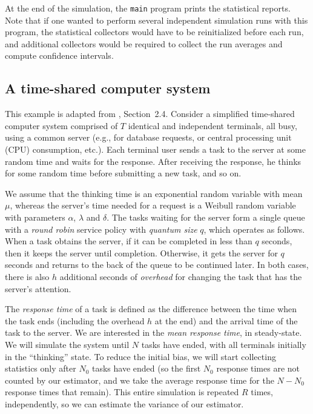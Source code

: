 At the end of the simulation, the \texttt{main} program prints the
statistical reports.  Note that if one wanted to perform several independent
simulation runs with this program, the statistical collectors would
have to be reinitialized before each run, and additional collectors
would be required to collect the run averages and compute confidence
intervals.





\subsection {A time-shared computer system}
\label {sec:timeshared}

This example is adapted from \cite{sLAW00a}, Section~2.4.
Consider a simplified time-shared computer system comprised of $T$
identical and independent terminals, all busy, using a common server
(e.g., for database requests, or central processing unit (CPU)
consumption, etc.).
Each terminal user sends a task to the server at some random time and
waits for the response.  After receiving the response, he thinks
for some random time before submitting a new task, and so on.

We assume that the thinking time is an exponential  random variable
with mean $\mu$, whereas the server's time needed for a request is a
Weibull random variable with parameters $\alpha$, $\lambda$ and $\delta$.
The tasks waiting for the server form a single queue with a
{\em round robin\/} service policy with {\em quantum size\/} $q$,
which operates as follows.
When a task obtains the server, if it can be completed in less than $q$
seconds, then it keeps the server until completion.
Otherwise, it gets the server for $q$ seconds and returns to the back
of the queue to be continued later.
In both cases, there is also $h$ additional seconds of {\em overhead\/}
for changing the task that has the server's attention.


The {\em response time\/} of a task is defined as the difference
between the time when the task ends (including the overhead $h$ at the
end) and the arrival time of the task to the server.
We are interested in the {\em mean response time}, in steady-state.
We will simulate the system until $N$ tasks have ended, with all
terminals initially in the ``thinking'' state.
To reduce the initial bias, we will start collecting statistics only
after $N_0$ tasks have ended (so the first $N_0$ response times are
not counted by our estimator, and we take the average response
time for the $N-N_0$ response times that remain).
This entire simulation is repeated $R$ times, independently,
so we can estimate the variance of our estimator.


